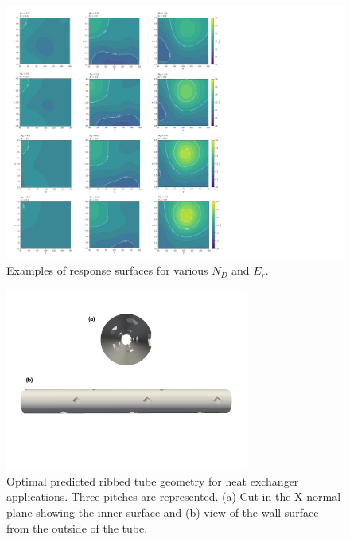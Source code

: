 \begin{figure}[p!]
\centering
\includegraphics[width=18cm]{fig/applications/optim/GP_discontinu_red.pdf}
\caption{Examples of response surfaces for various $N_D$ and $E_r$.}
\label{total_RS}
\end{figure}

\begin{figure}[h]
\centering
\includegraphics[width=8cm]{fig/applications/optim/geom_opt.pdf}
\caption{Optimal predicted ribbed tube geometry for heat exchanger applications. Three pitches are represented. (a) Cut in the X-normal plane showing the inner surface and (b) view of the wall surface from the outside of the tube.}
\label{geom_optim}
\end{figure}

